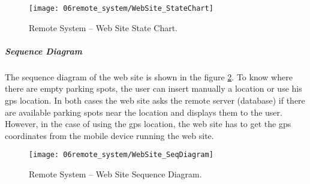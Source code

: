 \begin{figure}[H]
	\centering
	\texttt{[image: 06remote\_system/WebSite\_StateChart]}
	\caption{Remote System – Web Site State Chart.}
	\label{fig:StateChart_WebSite}
\end{figure}

\clearpage

\subparagraph*{Sequence Diagram}
The sequence diagram of the web site is shown in the figure \ref{fig:SeqDiagram_WebSite}. To know where there are empty parking spots, the user can insert manually a location or use his \ac{gps} location. In both cases the web site asks the remote server (database) if there are available parking spots near the location and displays them to the user. However, in the case of using the \ac{gps} location, the web site has to get the \ac{gps} coordinates from the mobile device running the web site.

\begin{figure}[H]
	\centering
	\texttt{[image: 06remote\_system/WebSite\_SeqDiagram]}
	\caption{Remote System – Web Site Sequence Diagram.}
	\label{fig:SeqDiagram_WebSite}
\end{figure}